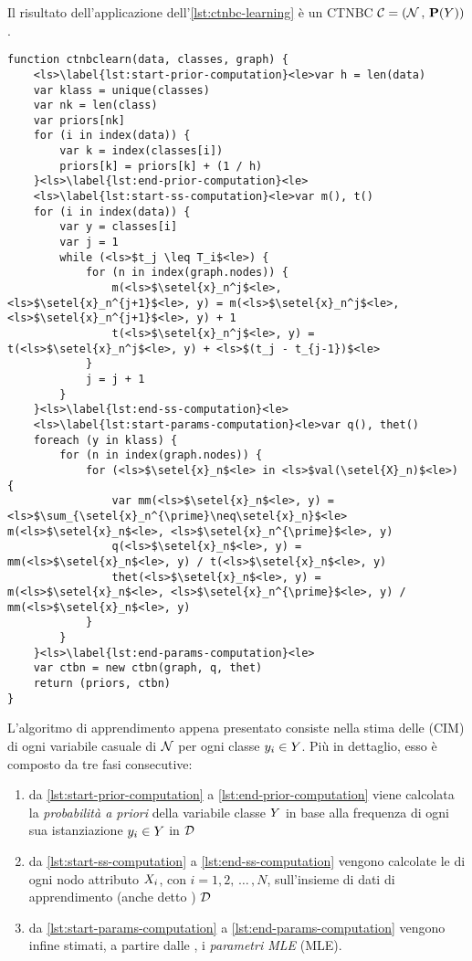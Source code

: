 Il risultato dell'applicazione dell'\autoref{lst:ctnbc-learning} è un \acl{CTNBC} $\mathcal{C}=(\mathcal{N}\,,\,\mathbf{P}(\mathnormal{Y}))$.
\vspace*{8pt}\begin{lstlisting}[language=pseudo,caption={[Apprendimento di un classificatore \acs{CTNB}]Apprendimento di un classificatore \acs{CTNB} (\acs{CTNBC}).}, label=lst:ctnbc-learning]
function ctnbclearn(data, classes, graph) {
    <ls>\label{lst:start-prior-computation}<le>var h = len(data)
    var klass = unique(classes)
    var nk = len(class)
    var priors[nk]
    for (i in index(data)) {
        var k = index(classes[i])
        priors[k] = priors[k] + (1 / h)
    }<ls>\label{lst:end-prior-computation}<le>
    <ls>\label{lst:start-ss-computation}<le>var m(), t()
    for (i in index(data)) {
        var y = classes[i]
        var j = 1
        while (<ls>$t_j \leq T_i$<le>) {
            for (n in index(graph.nodes)) {
                m(<ls>$\setel{x}_n^j$<le>, <ls>$\setel{x}_n^{j+1}$<le>, y) = m(<ls>$\setel{x}_n^j$<le>, <ls>$\setel{x}_n^{j+1}$<le>, y) + 1
                t(<ls>$\setel{x}_n^j$<le>, y) = t(<ls>$\setel{x}_n^j$<le>, y) + <ls>$(t_j - t_{j-1})$<le>
            }
            j = j + 1
        }
    }<ls>\label{lst:end-ss-computation}<le>
    <ls>\label{lst:start-params-computation}<le>var q(), thet()
    foreach (y in klass) {
        for (n in index(graph.nodes)) {
            for (<ls>$\setel{x}_n$<le> in <ls>$val(\setel{X}_n)$<le>) {
                var mm(<ls>$\setel{x}_n$<le>, y) = <ls>$\sum_{\setel{x}_n^{\prime}\neq\setel{x}_n}$<le> m(<ls>$\setel{x}_n$<le>, <ls>$\setel{x}_n^{\prime}$<le>, y)
                q(<ls>$\setel{x}_n$<le>, y) = mm(<ls>$\setel{x}_n$<le>, y) / t(<ls>$\setel{x}_n$<le>, y)
                thet(<ls>$\setel{x}_n$<le>, y) = m(<ls>$\setel{x}_n$<le>, <ls>$\setel{x}_n^{\prime}$<le>, y) / mm(<ls>$\setel{x}_n$<le>, y)
            }
        }
    }<ls>\label{lst:end-params-computation}<le>
    var ctbn = new ctbn(graph, q, thet)
    return (priors, ctbn)
}
\end{lstlisting}
L'algoritmo di apprendimento appena presentato consiste nella stima delle \cim{} (\acs{CIM}) di ogni variabile casuale di $\mathcal{N}$ per ogni classe $\mathnormal{y}_i \in \mathnormal{Y}$. Più in dettaglio, esso è composto da tre fasi consecutive:
\begin{enumerate}
    \item da \autoref{lst:start-prior-computation} a \autoref{lst:end-prior-computation} viene calcolata la \emph{probabilità a priori} della variabile classe $\mathnormal{Y}$ in base alla frequenza di ogni sua istanziazione $\mathnormal{y}_i \in\mathnormal{Y}$ in $\mathcal{D}$
    \item da \autoref{lst:start-ss-computation} a \autoref{lst:end-ss-computation} vengono calcolate le \stats{} di ogni nodo attributo $\mathnormal{X}_i$, con $i=1,2,\,\dotsc\,,N$, sull'insieme di dati di apprendimento (anche detto \emph{\keyword{\trs{}}}) $\mathcal{D}$
    \item da \autoref{lst:start-params-computation} a \autoref{lst:end-params-computation} vengono infine stimati, a partire dalle \stats{}, i \emph{parametri \acl{MLE}} (\acs{MLE}).
\end{enumerate}
